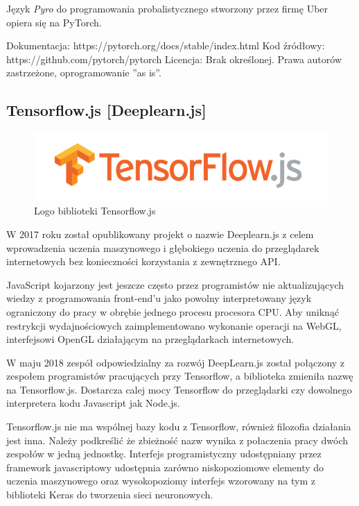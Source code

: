 \documentclass[12pt,a4paper,twoside,titlepage,openright]{book}
\begin{document}
Język \textit{Pyro} do programowania probalistycznego stworzony przez firmę Uber opiera się na PyTorch.

\noindent
\newline
Dokumentacja: https://pytorch.org/docs/stable/index.html
\newline
Kod źródłowy: https://github.com/pytorch/pytorch
\newline
Licencja: Brak określonej. Prawa autorów zastrzeżone, oprogramowanie ''as is''.


\subsection{Tensorflow.js [Deeplearn.js]}
\begin{figure}[ht]
	\centering
			\includegraphics[resolution=100, scale=0.6]{TensorflowJS.png}
		\caption{Logo biblioteki Tensorflow.js}
\end{figure}

W 2017 roku został opublikowany projekt o nazwie Deeplearn.js z celem wprowadzenia uczenia maszynowego i głębokiego uczenia do przeglądarek internetowych bez konieczności korzystania z zewnętrznego API.

JavaScript kojarzony jest jeszcze często przez programistów nie aktualizujących wiedzy z programowania front-end'u jako powolny interpretowany język ograniczony do pracy w obrębie jednego procesu procesora CPU. \cite{siteSlowJavaScript} Aby uniknąć restrykcji wydajnościowych zaimplementowano wykonanie operacji na WebGL, interfejsowi OpenGL działającym na przeglądarkach internetowych.

W maju 2018 zespół odpowiedzialny za rozwój DeepLearn.js został połączony z zespołem programistów pracujących przy Tensorflow, a biblioteka zmieniła nazwę na Tensorflow.js. Dostarcza calej mocy Tensorflow do przeglądarki czy dowolnego interpretera kodu Javascript jak Node.js.

Tensorflow.js nie ma wspólnej bazy kodu z Tensorflow, również filozofia działania jest inna. Należy podkreślić że zbieżność nazw wynika z połaczenia pracy dwóch zespołów w jedną jednostkę. Interfejs programistyczny udostępniany przez framework javascriptowy udostępnia zarówno niskopoziomowe elementy do uczenia maszynowego oraz wysokopoziomy interfejs wzorowany na tym z biblioteki Keras do tworzenia sieci neuronowych.
\end{document}
